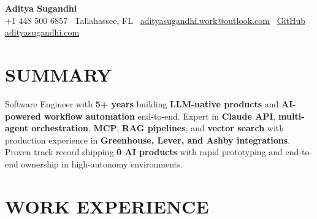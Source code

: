 \documentclass[letterpaper,10pt]{article}
\begin{document}
\begin{center}
{\huge\textbf{Aditya Sugandhi}} \\
+1 448 500 6857 \textbar\ \textcolor{metablue}{Tallahassee, FL} \textbar\
\href{mailto:adityasugandhi.work@outlook.com}{adityasugandhi.work@outlook.com} \textbar\
\href{https://github.com/adityasugandhi}{GitHub}
\textbar \href{https://adityasugandhi.com}{adityasugandhi.com}
\end{center}
\vspace{-12pt}

\section{\textcolor{metablue}{SUMMARY}}
\small
\vspace{-6pt}
Software Engineer with \textbf{5+ years} building \textbf{LLM-native products} and \textbf{AI-powered workflow automation} end-to-end. Expert in \textbf{Claude API}, \textbf{multi-agent orchestration}, \textbf{MCP}, \textbf{RAG pipelines}, and \textbf{vector search} with production experience in \textbf{Greenhouse, Lever, and Ashby integrations}. Proven track record shipping \textbf{0 AI products} with rapid prototyping and end-to-end ownership in high-autonomy environments.

\vspace{-9pt}

\section{\textcolor{metablue}{WORK EXPERIENCE}}
\vspace{-12pt}
\end{document}
